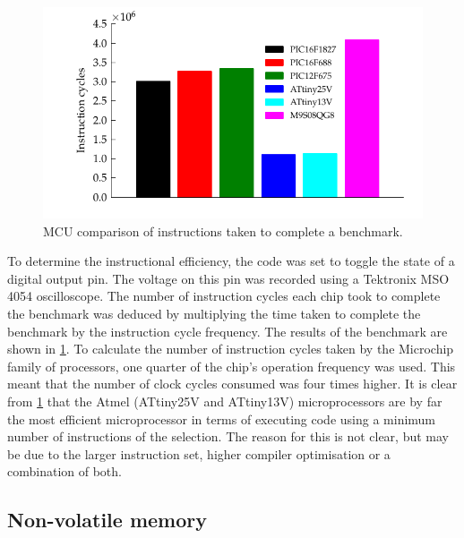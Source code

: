       \begin{figure}
          \begin{centering}
              \includegraphics{content/pt1/03-EnergyRequirements/graphics/Graph_All_Clock_Benchmark}
          \end{centering}
          \protect\caption{\label{fig:GraphBar_All_Benchmark}MCU comparison of instructions
          taken to complete a benchmark.}
      \end{figure}

      To determine the instructional efficiency, the code was set to toggle the state of a digital output pin.
      The voltage on this pin was recorded using a Tektronix MSO 4054 oscilloscope.
      The number of instruction cycles each chip took to complete the benchmark was deduced by multiplying the time taken to complete the benchmark by the instruction cycle frequency.
      The results of the benchmark are shown in \cref{fig:GraphBar_All_Benchmark}.
      To calculate the number of instruction cycles taken by the Microchip family of processors, one quarter of the chip's operation frequency was used.
      This meant that the number of clock cycles consumed was four times higher.
      It is clear from \cref{fig:GraphBar_All_Benchmark} that the Atmel (ATtiny25V and ATtiny13V) microprocessors are by far the most efficient microprocessor in terms of executing code using a minimum number of instructions of the selection.
      The reason for this is not clear, but may be due to the larger instruction set, higher compiler optimisation or a combination of both.



    \subsection{Non-volatile memory}

